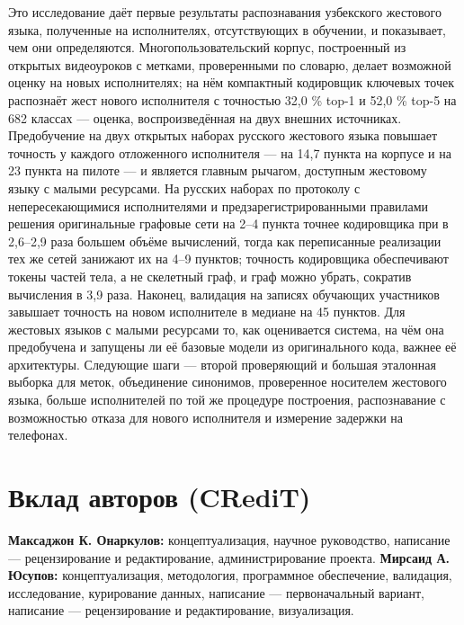 Это исследование даёт первые результаты распознавания узбекского жестового языка, полученные на исполнителях, отсутствующих в обучении, и показывает, чем они определяются. Многопользовательский корпус, построенный из открытых видеоуроков с метками, проверенными по словарю, делает возможной оценку на новых исполнителях; на нём компактный кодировщик ключевых точек распознаёт жест нового исполнителя с точностью 32,0 \% top-1 и 52,0 \% top-5 на 682 классах --- оценка, воспроизведённая на двух внешних источниках. Предобучение на двух открытых наборах русского жестового языка повышает точность у каждого отложенного исполнителя --- на 14,7 пункта на корпусе и на 23 пункта на пилоте --- и является главным рычагом, доступным жестовому языку с малыми ресурсами. На русских наборах по протоколу с непересекающимися исполнителями и предзарегистрированными правилами решения оригинальные графовые сети на 2--4 пункта точнее кодировщика при в 2,6--2,9 раза большем объёме вычислений, тогда как переписанные реализации тех же сетей занижают их на 4--9 пунктов; точность кодировщика обеспечивают токены частей тела, а не скелетный граф, и граф можно убрать, сократив вычисления в 3,9 раза. Наконец, валидация на записях обучающих участников завышает точность на новом исполнителе в медиане на 45 пунктов. Для жестовых языков с малыми ресурсами то, как оценивается система, на чём она предобучена и запущены ли её базовые модели из оригинального кода, важнее её архитектуры. Следующие шаги --- второй проверяющий и большая эталонная выборка для меток, объединение синонимов, проверенное носителем жестового языка, больше исполнителей по той же процедуре построения, распознавание с возможностью отказа для нового исполнителя и измерение задержки на телефонах.

\hypertarget{ux432ux43aux43bux430ux434-ux430ux432ux442ux43eux440ux43eux432-credit}{%
\section{Вклад авторов (CRediT)}\label{ux432ux43aux43bux430ux434-ux430ux432ux442ux43eux440ux43eux432-credit}}

\textbf{Максаджон К. Онаркулов:} концептуализация, научное руководство, написание --- рецензирование и редактирование, администрирование проекта. \textbf{Мирсаид А. Юсупов:} концептуализация, методология, программное обеспечение, валидация, исследование, курирование данных, написание --- первоначальный вариант, написание --- рецензирование и редактирование, визуализация.

